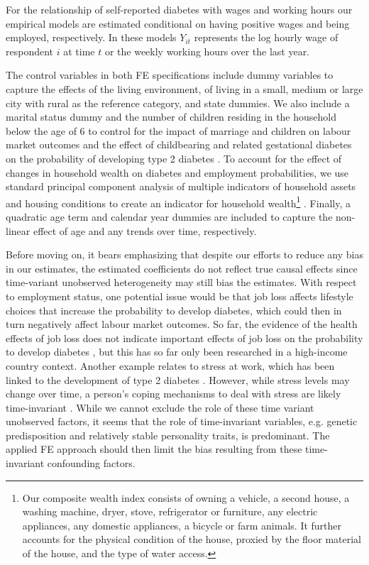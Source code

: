 For the relationship of self-reported diabetes with wages and working hours our empirical models are estimated conditional on having positive wages and being employed, respectively. In these models $Y_{it}$ represents the log hourly wage of respondent $i$ at time $t$ or the weekly working hours over the last year.

The control variables in both \ac{FE} specifications include dummy variables to capture the effects of the living environment,
of living in a small, medium or large city with rural as the reference category, and state dummies. We also include a marital status dummy and the number of children residing in the household below the age of 6 to control for the impact of marriage and children
on labour market outcomes and the effect of childbearing and related gestational diabetes on the probability of developing type 2 diabetes
\parencite{Bellamy2009}. To account for the effect of changes in household wealth on diabetes and employment probabilities, we use standard
principal component analysis of multiple indicators of household assets and housing conditions to create an indicator for household wealth\footnote{Our composite wealth index consists of owning a vehicle, a second house, a washing machine, dryer, stove, refrigerator or furniture, any electric appliances, any domestic appliances, a bicycle or farm animals. It further accounts for the physical condition of the house, proxied by the floor material of the house, and the type of water access.}
\parencite{Filmer2001}. Finally, a quadratic age term and calendar year dummies are included to capture the non-linear effect of age and any trends over time, respectively.

Before moving on, it bears emphasizing that despite our efforts to reduce any bias in our estimates, the estimated coefficients do not reflect true causal effects since time-variant unobserved heterogeneity may still bias the estimates. With respect to employment status, one potential issue would be that job loss affects lifestyle choices that increase the probability to develop diabetes, which could then in turn negatively affect labour market outcomes. So far, the evidence of the health effects of job loss does not indicate important effects of job loss on the probability to develop diabetes \parencite{Bergemann2011,Schaller2015}, but this has so far only been researched in a high-income country context. Another example relates to stress at work, which has been linked to the development of type 2 diabetes \parencite{Heraclides2012,Eriksson2013}. However, while stress levels may change over time, a person's coping mechanisms to deal with stress are likely time-invariant \parencite{Schneiderman2005}. While we cannot exclude the role of these time variant unobserved factors, it seems that the role of time-invariant variables, e.g. genetic predisposition and relatively stable personality traits, is predominant. The  applied \ac{FE} approach should then limit the bias resulting from these time-invariant confounding factors. 


